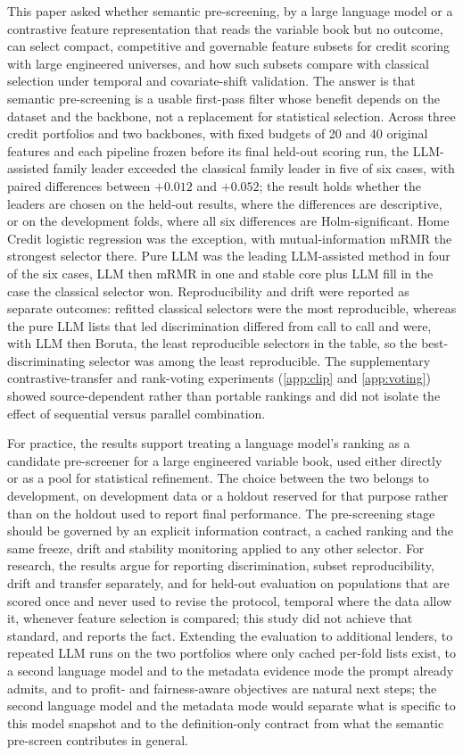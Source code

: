 \documentclass[final,5p,twocolumn]{elsarticle}
\begin{document}
This paper asked whether semantic pre-screening, by a large language model or a contrastive feature representation that reads the variable book but no outcome, can select compact, competitive and governable feature subsets for credit scoring with large engineered universes, and how such subsets compare with classical selection under temporal and covariate-shift validation. The answer is that semantic pre-screening is a usable first-pass filter whose benefit depends on the dataset and the backbone, not a replacement for statistical selection. Across three credit portfolios and two backbones, with fixed budgets of 20 and 40 original features and each pipeline frozen before its final held-out scoring run, the LLM-assisted family leader exceeded the classical family leader in five of six cases, with paired differences between $+0.012$ and $+0.052$; the result holds whether the leaders are chosen on the held-out results, where the differences are descriptive, or on the development folds, where all six differences are Holm-significant. Home Credit logistic regression was the exception, with mutual-information mRMR the strongest selector there. Pure LLM was the leading LLM-assisted method in four of the six cases, LLM then mRMR in one and stable core plus LLM fill in the case the classical selector won. Reproducibility and drift were reported as separate outcomes: refitted classical selectors were the most reproducible, whereas the pure LLM lists that led discrimination differed from call to call and were, with LLM then Boruta, the least reproducible selectors in the table, so the best-discriminating selector was among the least reproducible. The supplementary contrastive-transfer and rank-voting experiments (\ref{app:clip} and \ref{app:voting}) showed source-dependent rather than portable rankings and did not isolate the effect of sequential versus parallel combination.

For practice, the results support treating a language model's ranking as a candidate pre-screener for a large engineered variable book, used either directly or as a pool for statistical refinement. The choice between the two belongs to development, on development data or a holdout reserved for that purpose rather than on the holdout used to report final performance. The pre-screening stage should be governed by an explicit information contract, a cached ranking and the same freeze, drift and stability monitoring applied to any other selector. For research, the results argue for reporting discrimination, subset reproducibility, drift and transfer separately, and for held-out evaluation on populations that are scored once and never used to revise the protocol, temporal where the data allow it, whenever feature selection is compared; this study did not achieve that standard, and reports the fact. Extending the evaluation to additional lenders, to repeated LLM runs on the two portfolios where only cached per-fold lists exist, to a second language model and to the metadata evidence mode the prompt already admits, and to profit- and fairness-aware objectives are natural next steps; the second language model and the metadata mode would separate what is specific to this model snapshot and to the definition-only contract from what the semantic pre-screen contributes in general.
\end{document}
